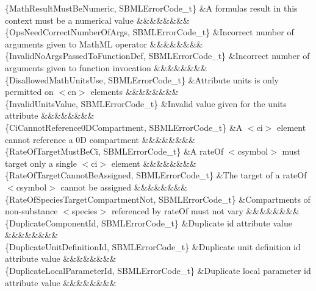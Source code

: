 \begin{DoxyParagraph}{}
\begin{longtabu}
\{Math\+Result\+Must\+Be\+Numeric, S\+B\+M\+L\+Error\+Code\+\_\+t\} &A formula\textquotesingle{}s result in this context must be a numerical value &&&&&&&&\\
\{Ops\+Need\+Correct\+Number\+Of\+Args, S\+B\+M\+L\+Error\+Code\+\_\+t\} &Incorrect number of arguments given to Math\+ML operator &&&&&&&&\\
\{Invalid\+No\+Args\+Passed\+To\+Function\+Def, S\+B\+M\+L\+Error\+Code\+\_\+t\} &Incorrect number of arguments given to function invocation &&&&&&&&\\
\{Disallowed\+Math\+Units\+Use, S\+B\+M\+L\+Error\+Code\+\_\+t\} &Attribute \textquotesingle{}units\textquotesingle{} is only permitted on {\ttfamily $<$cn$>$} elements &&&&&&&&\\
\{Invalid\+Units\+Value, S\+B\+M\+L\+Error\+Code\+\_\+t\} &Invalid value given for the \textquotesingle{}units\textquotesingle{} attribute &&&&&&&&\\
\{Ci\+Cannot\+Reference0\+D\+Compartment, S\+B\+M\+L\+Error\+Code\+\_\+t\} &A {\ttfamily $<$ci$>$} element cannot reference a 0D compartment &&&&&&&&\\
\{Rate\+Of\+Target\+Must\+Be\+Ci, S\+B\+M\+L\+Error\+Code\+\_\+t\} &A \textquotesingle{}rate\+Of\textquotesingle{} {\ttfamily $<$csymbol$>$} must target only a single {\ttfamily $<$ci$>$} element &&&&&&&&\\
\{Rate\+Of\+Target\+Cannot\+Be\+Assigned, S\+B\+M\+L\+Error\+Code\+\_\+t\} &The target of a \textquotesingle{}rate\+Of\textquotesingle{} {\ttfamily $<$csymbol$>$} cannot be assigned &&&&&&&&\\
\{Rate\+Of\+Species\+Target\+Compartment\+Not, S\+B\+M\+L\+Error\+Code\+\_\+t\} &Compartments of non-\/substance {\ttfamily $<$species$>$} referenced by \textquotesingle{}rate\+Of\textquotesingle{} must not vary &&&&&&&&\\
\{Duplicate\+Component\+Id, S\+B\+M\+L\+Error\+Code\+\_\+t\} &Duplicate \textquotesingle{}id\textquotesingle{} attribute value &&&&&&&&\\
\{Duplicate\+Unit\+Definition\+Id, S\+B\+M\+L\+Error\+Code\+\_\+t\} &Duplicate unit definition \textquotesingle{}id\textquotesingle{} attribute value &&&&&&&&\\
\{Duplicate\+Local\+Parameter\+Id, S\+B\+M\+L\+Error\+Code\+\_\+t\} &Duplicate local parameter \textquotesingle{}id\textquotesingle{} attribute value &&&&&&&&\\

\end{longtabu}
\end{DoxyParagraph}
